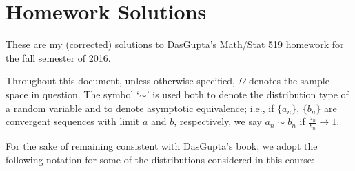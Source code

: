 \section{Homework Solutions}
These are my (corrected) solutions to DasGupta's Math/Stat 519 homework for
the fall semester of 2016.

Throughout this document, unless otherwise specified, \(\Omega\) denotes
the sample space in question. The symbol `\(\sim\)' is used both to denote
the distribution type of a random variable and to denote asymptotic
equivalence; i.e., if \(\{a_n\}\), \(\{b_n\}\) are convergent sequences
with limit \(a\) and \(b\), respectively, we say \(a_n\sim b_n\) if
\(\frac{a_n}{b_n}\to 1\).

For the sake of remaining consistent with DasGupta's book, we adopt the
following notation for some of the distributions considered in this course:

